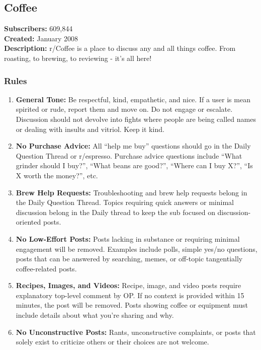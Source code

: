 \subsection{Coffee}
\textbf{Subscribers:} 609,844 \\
\textbf{Created:} January 2008 \\
\textbf{Description:} r/Coffee is a place to discuss any and all things coffee. From roasting, to brewing, to reviewing - it's all here!

\subsubsection{Rules}
\begin{enumerate}
    \item \textbf{General Tone:} Be respectful, kind, empathetic, and nice. If a user is mean spirited or rude, report them and move on. Do not engage or escalate. Discussion should not devolve into fights where people are being called names or dealing with insults and vitriol. Keep it kind.
    
    \item \textbf{No Purchase Advice:} All ``help me buy'' questions should go in the Daily Question Thread or r/espresso. Purchase advice questions include ``What grinder should I buy?'', ``What beans are good?'', ``Where can I buy X?'', ``Is X worth the money?'', etc.
    
    \item \textbf{Brew Help Requests:} Troubleshooting and brew help requests belong in the Daily Question Thread. Topics requiring quick answers or minimal discussion belong in the Daily thread to keep the sub focused on discussion-oriented posts.
    
    \item \textbf{No Low-Effort Posts:} Posts lacking in substance or requiring minimal engagement will be removed. Examples include polls, simple yes/no questions, posts that can be answered by searching, memes, or off-topic tangentially coffee-related posts.
    
    \item \textbf{Recipes, Images, and Videos:} Recipe, image, and video posts require explanatory top-level comment by OP. If no context is provided within 15 minutes, the post will be removed. Posts showing coffee or equipment must include details about what you're sharing and why.
    
    \item \textbf{No Unconstructive Posts:} Rants, unconstructive complaints, or posts that solely exist to criticize others or their choices are not welcome.
    

\end{enumerate}
